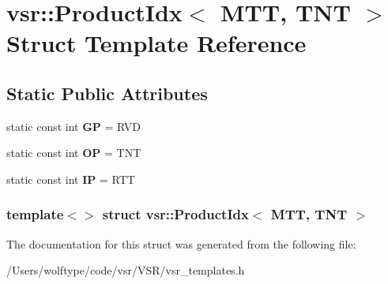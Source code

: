\hypertarget{structvsr_1_1_product_idx_3_01_m_t_t_00_01_t_n_t_01_4}{\section{vsr\-:\-:Product\-Idx$<$ M\-T\-T, T\-N\-T $>$ Struct Template Reference}
\label{structvsr_1_1_product_idx_3_01_m_t_t_00_01_t_n_t_01_4}
}
\subsection*{Static Public Attributes}
\begin{DoxyCompactItemize}
\item 
\hypertarget{structvsr_1_1_product_idx_3_01_m_t_t_00_01_t_n_t_01_4_a97ff763987ffc3e14423afc2c1627b29}{static const int {\bfseries G\-P} = R\-V\-D}\label{structvsr_1_1_product_idx_3_01_m_t_t_00_01_t_n_t_01_4_a97ff763987ffc3e14423afc2c1627b29}

\item 
\hypertarget{structvsr_1_1_product_idx_3_01_m_t_t_00_01_t_n_t_01_4_ad3dc11aa21059b0f75a9a31bd6224d4b}{static const int {\bfseries O\-P} = T\-N\-T}\label{structvsr_1_1_product_idx_3_01_m_t_t_00_01_t_n_t_01_4_ad3dc11aa21059b0f75a9a31bd6224d4b}

\item 
\hypertarget{structvsr_1_1_product_idx_3_01_m_t_t_00_01_t_n_t_01_4_a7e94f4f18516727188dd654737d45a0c}{static const int {\bfseries I\-P} = R\-T\-T}\label{structvsr_1_1_product_idx_3_01_m_t_t_00_01_t_n_t_01_4_a7e94f4f18516727188dd654737d45a0c}

\end{DoxyCompactItemize}
\subsubsection*{template$<$$>$ struct vsr\-::\-Product\-Idx$<$ M\-T\-T, T\-N\-T $>$}



The documentation for this struct was generated from the following file\-:\begin{DoxyCompactItemize}
\item 
/\-Users/wolftype/code/vsr/\-V\-S\-R/vsr\-\_\-templates.\-h\end{DoxyCompactItemize}
